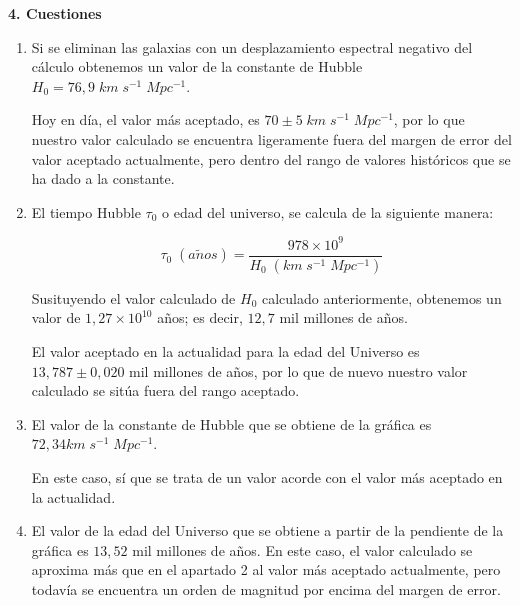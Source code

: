 \textbf{4. Cuestiones}

\vspace{20px}

\begin{enumerate}

    \item Si se eliminan las galaxias con un desplazamiento espectral negativo del cálculo  obtenemos un
    valor de la constante de Hubble $H_0 = 76,9\;km\;s^{-1}\;Mpc^{-1}$.

    Hoy en día, el valor más aceptado, es $70 \pm 5 \; km\;s^{-1}\;Mpc^{-1}$, por lo que nuestro valor calculado
    se encuentra ligeramente fuera del margen de error del valor aceptado actualmente, pero dentro del rango de valores
    históricos que se ha dado a la constante.

    \vspace{20px}

    \item El tiempo Hubble $\tau_0$ o edad del universo, se calcula de la siguiente manera:

    \begin{equation*}
        \tau_0\;(a\tilde{n}os) = \frac{978 \times 10^9}{H_0\; (km\;s^{-1}\;Mpc^{-1})}
        \end{equation*}

    Susituyendo el valor calculado de $H_0$ calculado anteriormente, obtenemos un valor de $1,27 \times 10^{10}$ años; es decir,
    $12,7$ mil millones de años.

    El valor aceptado en la actualidad para la edad del Universo es $13,787 \pm 0,020$ mil millones de años, por lo que de nuevo
    nuestro valor calculado se sitúa fuera del rango aceptado.

    \vspace{20px}

    \item El valor de la constante de Hubble que se obtiene de la gráfica es $72,34 km\;s^{-1}\;Mpc^{-1}$.

    En este caso, sí que se trata de un valor acorde con el valor más aceptado en la actualidad.

    \vspace{20px}

    \item El valor de la edad del Universo que se obtiene a partir de la pendiente de la gráfica es $13,52$ mil millones de años.
    En este caso, el valor calculado se aproxima más que en el apartado 2 al valor más aceptado actualmente, pero todavía se encuentra un orden de magnitud
    por encima del margen de error.


\end{enumerate}
